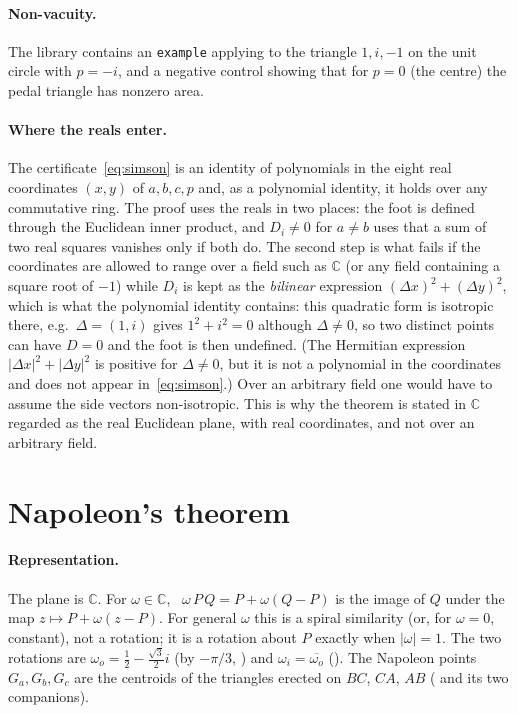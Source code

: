 \documentclass[11pt]{article}
\theoremstyle{definition}
\theoremstyle{remark}
\newcommand{\lean}[1]{\texttt{#1}}
\newcommand{\CC}{\mathbb{C}}
\begin{document}
\paragraph{Non-vacuity.} The library contains an \lean{example} applying  to the
triangle $1,i,-1$ on the unit circle with $p=-i$, and a negative control showing that for $p=0$
(the centre) the pedal triangle has nonzero area.

\paragraph{Where the reals enter.} The certificate~\eqref{eq:simson} is an identity of
polynomials in the eight real coordinates $(x,y)$ of $a,b,c,p$ and, as a polynomial identity, it
holds over any commutative ring. The proof uses the reals in two places: the foot is defined
through the Euclidean inner product, and $D_i\ne0$ for $a\ne b$ uses that a sum of two real
squares vanishes only if both do. The second step is what fails if the coordinates are allowed to
range over a field such as $\CC$ (or any field containing a square root of $-1$) while $D_i$ is
kept as the \emph{bilinear} expression $(\Delta x)^2+(\Delta y)^2$, which is what the polynomial
identity contains: this quadratic form is isotropic there, e.g.\ $\Delta=(1,i)$ gives
$1^2+i^2=0$ although $\Delta\ne0$, so two distinct points can have $D=0$ and the foot is then
undefined. (The Hermitian expression $|\Delta x|^2+|\Delta y|^2$ is positive for $\Delta\ne0$, but
it is not a polynomial in the coordinates and does not appear in~\eqref{eq:simson}.) Over an
arbitrary field one would have to assume the side vectors non-isotropic. This is why the theorem
is stated in $\CC$ regarded as the real Euclidean plane, with real coordinates, and not over an
arbitrary field.

\section{Napoleon's theorem}\label{sec:napoleon}

\paragraph{Representation.} The plane is $\CC$. For $\omega\in\CC$, ~$\omega\,P\,Q
=P+\omega(Q-P)$ is the image of $Q$ under the map $z\mapsto P+\omega(z-P)$. For general $\omega$
this is a spiral similarity (or, for $\omega=0$, constant), not a rotation; it is a rotation about
$P$ exactly when $|\omega|=1$.
The two rotations are $\omega_o=\tfrac12-\tfrac{\sqrt3}2 i$ (by $-\pi/3$, ) and
$\omega_i=\overline{\omega_o}$ (). The Napoleon points $G_a,G_b,G_c$ are the
centroids of the triangles erected on $BC$, $CA$, $AB$ ( and its two
companions).
\end{document}
